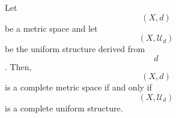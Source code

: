 Let $$(X, d)$$ be a metric space and let $$(X, \mathcal{U}_d)$$ be the uniform structure derived from $$d$$. Then, $$(X, d)$$ is a complete metric space if and only if $$(X, \mathcal{U}_d)$$ is a complete uniform structure.
